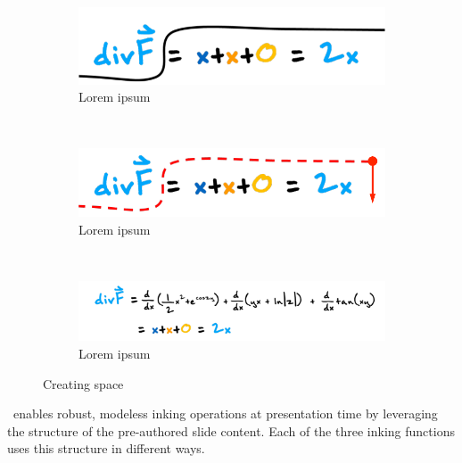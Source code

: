 \begin{figure}[t!]
    \centering
    \begin{subfigure}[t]{0.48\columnwidth}
        \centering
        \includegraphics[width=1\columnwidth]{figures/create_space1}
        \caption{Lorem ipsum}
    \end{subfigure}%
    ~ 
    \begin{subfigure}[t]{0.48\columnwidth}
        \centering
        \includegraphics[width=1\columnwidth]{figures/create_space2}
        \caption{Lorem ipsum}
    \end{subfigure}
    ~
        \begin{subfigure}[t]{1\columnwidth}
        \centering
        \includegraphics[width=1\columnwidth]{figures/create_space3}
        \caption{Lorem ipsum}
    \end{subfigure}  
    \caption{Creating space}
\end{figure}


\interface\ enables robust, modeless inking operations at presentation time by leveraging the structure of the pre-authored slide content. Each of the three inking functions uses this structure in different ways. 

